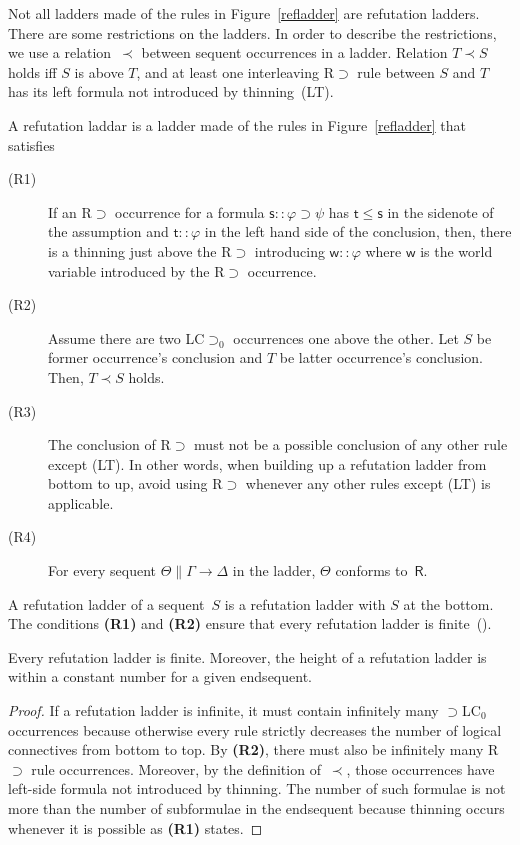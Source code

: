   Not all ladders made of the rules in Figure~\ref{refladder} are
  refutation ladders.
  There are some restrictions on the ladders.
  In order to describe the restrictions,
  we use a relation~$\prec$ between sequent occurrences in a ladder.
  Relation $T\prec S$ holds iff
  $S$ is above $T$, and
  at least one interleaving \textrm{R$\supset$} rule between $S$ and $T$
  has its left formula not introduced by thinning~(LT).
  \begin{definition}
   A refutation laddar is a ladder made of the rules in
   Figure~\ref{refladder} that satisfies
   \begin{description}
    \item[ (R1)]
	 If an \textrm{R$\supset$} occurrence
	 for a formula
	 $\mathsf s::\varphi\supset\psi$ has $\mathsf t\le \mathsf s$
	 in the sidenote of the assumption and
	 $\mathsf t::\varphi$ in the left hand side of the conclusion,
	 then,
	 there is a thinning just above the R$\supset$ introducing
	 $\mathsf w::\varphi$ where $\mathsf w$ is the world variable
	 introduced by the \textrm{R$\supset$} occurrence.
    \item[ (R2)]
	 Assume there are two \textrm{LC$\supset_0$} occurrences one above the
	 other.
	 Let $S$ be former occurrence's conclusion and $T$ be latter occurrence's
	 conclusion.
	 Then, $T\prec S$ holds.
    \item[ (R3)]
	 The conclusion of \textrm{R$\supset$} must not be a
	 possible conclusion of any other rule except (LT).
	 In other words, when building up a refutation ladder from
	 bottom to up, avoid using R$\supset$ whenever any other
	 rules except (LT) is applicable.
    \item[ (R4)]
	 For every sequent $\Theta\parallel \Gamma\rightarrow\Delta$
	 in the ladder, $\Theta$ conforms to~$\mathsf R$.
   \end{description}
  \end{definition}
  A refutation ladder of a sequent~$S$ is a refutation ladder
  with
  $S$ at the bottom.
  The conditions \textbf{(R1)} and \textbf{(R2)} ensure that every
  refutation ladder is finite~().

  \begin{proposition}
   \label{refladder-finite}
   Every refutation ladder is finite.  Moreover, the height of a
   refutation ladder is within a constant number for a given endsequent.
  \end{proposition}
  \begin{proof}
   If a refutation ladder is infinite,
   it must contain infinitely many $\supset$LC$_0$ occurrences because
   otherwise every rule strictly decreases the number of logical connectives from
   bottom to top.
   By \textbf{(R2)}, there must also be infinitely many R$\supset$ rule
   occurrences.
   Moreover, by the definition of~$\prec$,
   those occurrences have left-side formula not
   introduced by thinning.
   The number of such formulae is not more than the number of subformulae
   in the endsequent because thinning occurs whenever it is possible as
   \textbf{(R1)} states.
  \end{proof}

